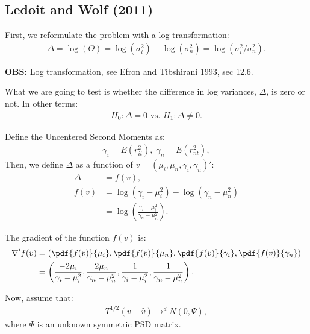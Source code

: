 \documentclass[12pt,oneside,a4paper]{article}
\begin{document}
\subsection{Ledoit and Wolf (2011)}

First, we reformulate the problem with a log transformation: 
\begin{align}
\Delta = \log(\Theta) =
\log(\sigma_{i}^{2}) - \log(\sigma_{n}^{2})  =
\log(\sigma_{i}^{2}/\sigma_{n}^{2}).
\end{align}

\noindent
{\footnotesize
\textbf{OBS:} Log transformation, see Efron and Tibshirani 1993, sec 12.6.}
\vspace{1 em}

What we are going to test is whether the difference in log variances, $\Delta$, is zero or not.
In other terms:
\begin{align*}
	H_{0}: \Delta=0 \text{ vs. } H_{1}: \Delta \neq 0.
\end{align*}

Define the Uncentered Second Moments as:
\begin{align*}
	\gamma_{i} = E(r_{it}^{2}), \; \gamma_{n} = E(r_{nt}^{2}),
\end{align*}
Then, we define $\Delta$ as a function of $v = (\mu_{i}, \mu_{n}, \gamma_{i}, \gamma_{n})'$:
\begin{align*}
\Delta &= f(v),
\\
f(v) &=
\log{(\gamma_{i} - \mu^2_{i})} - \log{(\gamma_{n} - \mu^2_{n})} \\ &=
\log\left( {\frac{\gamma_{i} - \mu^2_{i}}{\gamma_{n} - \mu^2_{n}}} \right).
\end{align*}

The gradient of the function $f(v)$ is:
\begin{align}
\nabla' f(v) &=
\left( 
\pdf{f(v)}{\mu_{i}},
\pdf{f(v)}{\mu_{n}},
\pdf{f(v)}{\gamma_{i}},
\pdf{f(v)}{\gamma_{n}}
\right)
\\ &=
\left( 
\frac{-2 \mu_{i}}{\gamma_{i} - \mu_{i}^2},
\frac{2 \mu_{n}}{\gamma_{n} - \mu_{n}^2},
\frac{1}{\gamma_{i} - \mu_{i}^2},  
\frac{1}{\gamma_{n} - \mu_{n}^2}
\right).
\end{align}

Now, assume that:
\begin{align}
	T^{1/2}(v - \hat{v}) \to^d N(0, \Psi),
\end{align}
where $\Psi$ is an unknown symmetric PSD matrix.
\end{document}
